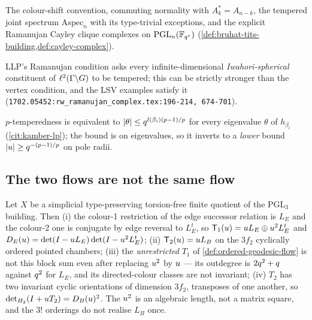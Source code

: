 \begin{assumption}
\label{asm:h-lsv}
The colour-shift convention, commuting normality with $A_k^* = A_{n-k}$, the
tempered joint spectrum $\mathrm{Aspec}_n$ with its type-trivial exceptions, and
the explicit Ramanujan Cayley clique complexes on $\mathrm{PGL}_n(\mathbb F_{q^{e}})$
(\cref{def:bruhat-tits-building,def:cayley-complex}).
\end{assumption}

\begin{assumption}
\label{asm:h-strong}
LLP's Ramanujan condition asks every infinite-dimensional
\emph{Iwahori-spherical} constituent of $\ell^2(\Gamma\backslash G)$ to be
tempered; this can be strictly stronger than the vertex condition, and the LSV
examples satisfy it (\texttt{1702.05452:rw\_ramanujan\_complex.tex:196-214,
674-701}).
\end{assumption}

\begin{assumption}
\label{asm:h-kamber}
$p$-temperedness is equivalent to $|\theta|\le q^{l(\beta_i)(p-1)/p}$ for every %
eigenvalue $\theta$ of $h_{\beta_i}$ (\cref{cit:kamber-lp}); the bound is on %
eigenvalues, so it inverts to a \emph{lower} bound $|u|\ge q^{-(p-1)/p}$ on
pole radii.
\end{assumption}

\subsection{The two flows are not the same flow}
\begin{theorem}
\label{thm:ordered-vs-building}
Let $X$ be a simplicial type-preserving torsion-free finite quotient of the
$\mathrm{PGL}_3$ building. Then (i) the colour-1 restriction of the edge
successor relation is $L_E$ and the colour-2 one is conjugate by edge reversal
to $L_E^t$, so $\mathsf T_1(u) = u L_E\oplus u^2L_E^t$ and
$D_E(u) = \det(I-u L_E)\det(I-u^2L_E^t)$; (ii)
$\mathsf T_2(u) = u L_B$ on the $3f_2$ cyclically ordered pointed chambers;
(iii) the \emph{unrestricted} $T_1$ of \cref{def:ordered-geodesic-flow} is not
this block sum even after replacing $u^2$ by $u$ --- its outdegree is
$2q^2+q$ against $q^2$ for $L_E$, and its directed-colour classes are not
invariant; (iv) $T_2$ has two invariant cyclic orientations of dimension $3f_2$,
transposes of one another, so $\det_{H_2}(I+u T_2) = D_B(u)^2$. The $u^2$
is an algebraic length, not a matrix square, and the $3!$ orderings do not
realise $L_B$ once.
\end{theorem}

